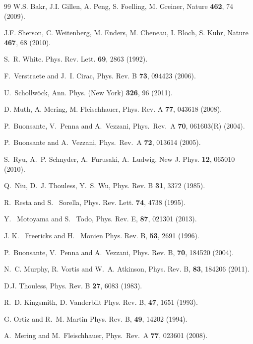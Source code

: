 \documentclass[pra,aps,twocolumn,showpacs]{revtex4}
\begin{document}
\begin{thebibliography}{99}
 W.S. Bakr, J.I. Gillen, A. Peng, S. Foelling, M. Greiner,
Nature \textbf{462}, 74 (2009).

 J.F. Sherson, C. Weitenberg, M. Enders, M. Cheneau, I. Bloch,
S. Kuhr, Nature \textbf{467}, 68 (2010).

 S.~R. White.
Phys. Rev. Lett. \textbf{69}, 2863 (1992).

 F.~Verstraete and J.~I. Cirac,
Phys. Rev. B \textbf{73}, 094423 (2006).

 U.~Schollw{\"{o}}ck,
Ann. Phys. (New York) \textbf{326}, 96 (2011).

D. Muth, A. Mering, M. Fleischhauer, 
Phys. Rev. A  \textbf{77}, 043618 (2008).

	P.\ Buonsante, V.\ Penna and A.\ Vezzani, Phys.\ Rev.\ A {\bf 70}, 061603(R) (2004).
	
	P.\ Buonsante and A.\ Vezzani, Phys.\ Rev.\ A {\bf 72}, 013614 (2005).


 S.~Ryu, A.~P. Schnyder, A.~Furusaki, A.~Ludwig,
 New J. Phys. \textbf{12}, 065010 (2010).

 Q.~Niu,
  D.~J. Thouless,
  Y.~S. Wu, Phys. Rev. B \textbf{31}, 3372 (1985).
  
 R.~Resta and S.~ Sorella, 
Phys. Rev. Lett. \textbf{74}, 4738 (1995).




 Y.~ Motoyama and S.~ Todo,
Phys. Rev. E, \textbf{87}, 021301 (2013).

 J. K. ~Freericks and H. ~Monien
Phys. Rev. B, \textbf{53}, 2691 (1996).

 P.\ Buonsante, V.\ Penna and A.\ Vezzani, 
Phys. Rev. B, \textbf{70}, 184520 (2004).

 N.~C. Murphy, R. Vortis and W.~A. Atkinson,
Phys. Rev. B, \textbf{83}, 184206 (2011).

 D.J. Thouless,
Phys. Rev. B {\bf 27}, 6083 (1983).

 R.~D. Kingsmith, D. Vanderbilt
Phys. Rev. B, \textbf{47}, 1651 (1993).

 G. Ortiz and R.~M. Martin
Phys. Rev. B, \textbf{49}, 14202 (1994).


	A.\ Mering and M.\ Fleischhauer, Phys.\ Rev.\ A {\bf 77}, 023601 (2008).


\end{thebibliography} 
\end{document}
